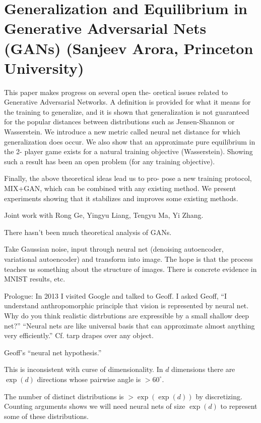 \section{Generalization and Equilibrium in Generative Adversarial Nets (GANs) (Sanjeev Arora, Princeton University)}

This paper makes progress on several open the- oretical issues related to Generative Adversarial Networks. A definition is provided for what it means for the training to generalize, and it is shown that generalization is not guaranteed for the popular distances between distributions such as Jensen-Shannon or Wasserstein. We introduce a new metric called neural net distance for which generalization does occur. We also show that an approximate pure equilibrium in the 2- player game exists for a natural training objective (Wasserstein). Showing such a result has been an open problem (for any training objective).

Finally, the above theoretical ideas lead us to pro- pose a new training protocol, MIX+GAN, which can be combined with any existing method. We present experiments showing that it stabilizes and improves some existing methods.

Joint work with Rong Ge, Yingyu Liang, Tengyu Ma, Yi Zhang. 

There hasn't been much theoretical analysis of GANs.

Take Gaussian noise, input through neural net (denoising autoencoder, variational autoencoder) and transform into image. The hope is that the process teaches us something about the structure of images. 
There is concrete evidence in MNIST results, etc.

%


Prologue: In 2013 I visited Google and talked to Geoff. I asked Geoff, ``I understand anthropomorphic principle that vision is represented by neural net. Why do you think realistic distrbutions are expressible by a small shallow deep net?'' ``Neural nets are like universal basis that can approximate almost anything very efficiently.'' Cf. tarp drapes over any object.

Geoff's ``neural net hypothesis.''

This is inconsistent with curse of dimensionality. In $d$ dimensions there are $\exp(d)$ directions whose pairwise angle is $>60^{\circ}$.

The number of distinct distributions is $>\exp(\exp(d))$ by discretizing. 
Counting arguments shows we will need neural nets of size $\exp(d)$ to represent some of these distributions.

